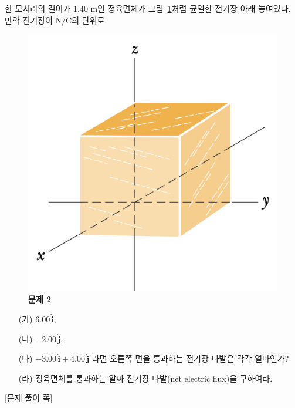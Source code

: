 \documentclass[tightenlines,floatfix,nofootinbib,superscriptaddress,fleqn]{revtex4}
\begin{document}
 한 모서리의 길이가 1.40 m인 정육면체가
그림~\ref{fig:1}처럼 균일한 전기장 아래 놓여있다. 만약 전기장이
N/C의 단위로 
\begin{figure}[htp]
  \centering
  \includegraphics[scale=0.6]{qfig3-1.png}
  \caption{\textbf{문제 2}}
  \label{fig:1}
\end{figure}
\begin{itemize}
\item[(가)] $6.00\,\hat{\bm{i}}$,
\item[(나)] $-2.00\,\hat{\bm{j}}$,
\item[(다)] $-3.00\,\hat{\bm{i}}+4.00\,\hat{\bm{j}}$  
  라면 오른쪽 면을 통과하는 전기장 다발은 각각 얼마인가?
\item[(라)] 정육면체를 통과하는 알짜 전기장 다발(net electric flux)을
  구하여라.   
\end{itemize}


\newpage
{\color{gray} [문제 풀이 쪽]}
\newpage
\end{document}
